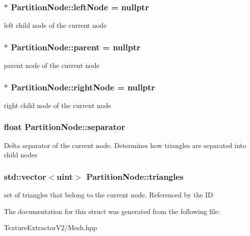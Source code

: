 \subsubsection[{left\+Node}]{$\ast$ Partition\+Node\+::left\+Node = nullptr}\label{struct_partition_node_a82bfd35cfcfc913ab41b2cb8c3c2f499}
left child node of the current node \hypertarget{struct_partition_node_a4d66482e5a4c91717fd0d935557ceb14}{}
\subsubsection[{parent}]{$\ast$ Partition\+Node\+::parent = nullptr}\label{struct_partition_node_a4d66482e5a4c91717fd0d935557ceb14}
parent node of the current node \hypertarget{struct_partition_node_a673d8267a9eb0a5c77bdfc48b00f1e16}{}
\subsubsection[{right\+Node}]{$\ast$ Partition\+Node\+::right\+Node = nullptr}\label{struct_partition_node_a673d8267a9eb0a5c77bdfc48b00f1e16}
right child node of the current node \hypertarget{struct_partition_node_aa1c74a380fa906533ad5e7649293e711}{}
\subsubsection[{separator}]{\setlength{\rightskip}{0pt plus 5cm}float Partition\+Node\+::separator}\label{struct_partition_node_aa1c74a380fa906533ad5e7649293e711}
Delta separator of the current node. Determines how triangles are separated into child nodes \hypertarget{struct_partition_node_a45bf7beca48bcb4533d7f7d21e0df440}{}
\subsubsection[{triangles}]{\setlength{\rightskip}{0pt plus 5cm}std\+::vector$<$uint$>$ Partition\+Node\+::triangles}\label{struct_partition_node_a45bf7beca48bcb4533d7f7d21e0df440}
set of triangles that belong to the current node. Referenced by the I\+D 

The documentation for this struct was generated from the following file\+:\begin{DoxyCompactItemize}
\item 
Texture\+Extractor\+V2/Mesh.\+hpp\end{DoxyCompactItemize}
